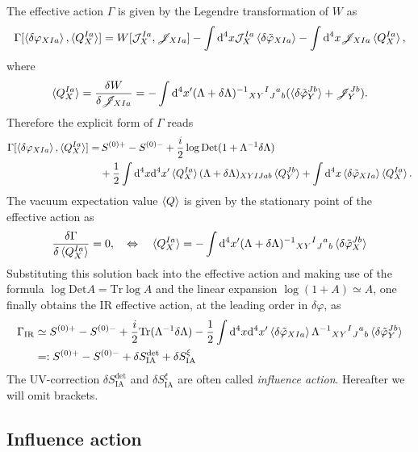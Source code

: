 \documentclass[aps, prd
, preprint
, nofootinbib 
, longbibliography
]{revtex4-1}
\newcommand{\dd}{\mathrm{d}}
\newcommand{\IR}{\mathrm{IR}}
\newcommand{\Det}{\mathrm{Det}}
\newcommand{\Tr}{\mathrm{Tr}}
\newcommand{\IA}{\mathrm{IA}}
\newcommand{\calJ}{\mathcal{J}}
\newcommand{\scrJ}{\mathscr{J}}
\newcommand{\bae}[1]{\begin{align} #1 \end{align}}
\begin{document}
The effective action $\Gamma$ is given by the Legendre transformation of $W$ as
\bae{
    \Gamma[\braket{\delta\varphi_{XIa}},\braket{Q_X^{Ia}}]=W[\calJ_X^{Ia},\scrJ_{XIa}]-\int\dd^4x\calJ_X^{Ia}\braket{\delta\tilde{\varphi}_{XIa}}-\int\dd^4x\scrJ_{XIa}\braket{Q_X^{Ia}},
}
where
\bae{
    \braket{Q_X^{Ia}}=\frac{\delta W}{\delta\scrJ_{XIa}}=-\int\dd^4x^\prime(\Lambda+\delta\Lambda)^{-1}{}_{XY}{}^I{}_J{}^a{}_b(\braket{\delta\tilde{\varphi}_Y^{Jb}}+\scrJ_Y^{Jb}).
}
Therefore the explicit form of $\Gamma$ reads
\bae{
    \Gamma[\braket{\delta\varphi_{XIa}},\braket{Q_X^{Ia}}]=&\,S^{(0)+}-S^{(0)-}+\frac{i}{2}\log\Det(1+\Lambda^{-1}\delta\Lambda) \nonumber \\
    &+\frac{1}{2}\int\dd^4x\dd^4x^\prime\braket{Q_X^{Ia}}(\Lambda+\delta\Lambda)_{XYIJab}\braket{Q_Y^{Jb}}+\int\dd^4x\braket{\delta\tilde{\varphi}_{XIa}}\braket{Q_X^{Ia}}.
}
The vacuum expectation value $\braket{Q}$ is given by the stationary point of the effective action as
\bae{
    \frac{\delta\Gamma}{\delta\braket{Q_X^{Ia}}}=0, \quad \Leftrightarrow \quad \braket{Q_X^{Ia}}=-\int\dd^4x^\prime(\Lambda+\delta\Lambda)^{-1}{}_{XY}{}^I{}_J{}^a{}_b\braket{\delta\tilde{\varphi}_X^{Jb}}
}
Substituting this solution back into the effective action and making use of the formula $\log\Det A=\Tr\log A$ and the linear expansion $\log(1+A)\simeq A$, one finally obtains the IR effective action, at the leading order in $\delta\varphi$, as
\bae{\label{eq: GammaIR}
    \Gamma_\IR&\simeq S^{(0)+}-S^{(0)-}+\frac{i}{2}\Tr(\Lambda^{-1}\delta\Lambda)-\frac{1}{2}\int\dd^4x\dd^4x^\prime\braket{\delta\tilde{\varphi}_{XIa}}\Lambda^{-1}{}_{XY}{}^I{}_J{}^a{}_b\braket{\delta\tilde{\varphi}_Y^{Jb}} \nonumber \\
    &=:S^{(0)+}-S^{(0)-}+\delta S_\IA^\mathrm{det}+\delta S_\IA^\xi
}
The UV-correction $\delta S_\IA^\mathrm{det}$ and $\delta S_\IA^\xi$ are often called \emph{influence action}.
Hereafter we will omit brackets.




\subsection{Influence action}
\end{document}

